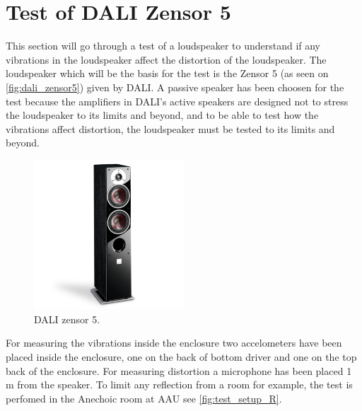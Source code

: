 \section{Test of DALI Zensor 5}
This section will go through a test of a loudspeaker to understand if any vibrations in the loudspeaker affect the distortion of the loudspeaker.
The loudspeaker which will be the basis for the test is the Zensor 5 (as seen on \autoref{fig:dali_zensor5}) given by DALI. A passive speaker has been choosen for the test because the amplifiers in DALI's active speakers are designed not to stress the loudspeaker to its limits and beyond, and to be able to test how the vibrations affect distortion, the loudspeaker must be tested to its limits and beyond.

\begin{figure}[H]
\centering
\includegraphics[width=0.5\textwidth]{figures/zensor5.png}
\caption{DALI zensor 5.}
\label{fig:dali_zensor5}
\end{figure}


For measuring the vibrations inside the enclosure two accelometers have been placed inside the enclosure, one on the back of bottom driver and one on the top back of the enclosure. For measuring distortion a microphone has been placed 1 m from the speaker. To limit any reflection from a room for example, the test is perfomed in the Anechoic room at \gls{AAU} see \ref{fig:test_setup_R}.   

